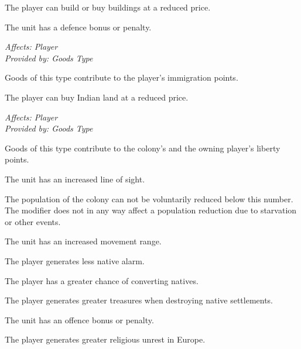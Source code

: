 \documentclass[12pt]{book}
\begin{document}
The player can build or buy buildings at a reduced price.

\affectsUnit

The unit has a defence bonus or penalty.

\textit{Affects: Player\\Provided by: Goods Type}

Goods of this type contribute to the player's immigration points.

\affectsPlayer

The player can buy Indian land at a reduced price.

\textit{Affects: Player\\Provided by: Goods Type}

Goods of this type contribute to the colony's and the owning player's
liberty points.

\affectsUnit

The unit has an increased line of sight.

\affectsColonyTwo

The population of the colony can not be voluntarily reduced below this
number. The modifier does not in any way affect a population reduction
due to starvation or other events.

\affectsUnit

The unit has an increased movement range.

\affectsPlayer

The player generates less native alarm.

\affectsPlayer

The player has a greater chance of converting natives.

\affectsPlayer

The player generates greater treasures when destroying native settlements.

\affectsUnit

The unit has an offence bonus or penalty.

\affectsPlayer

The player generates greater religious unrest in Europe.
\end{document}

